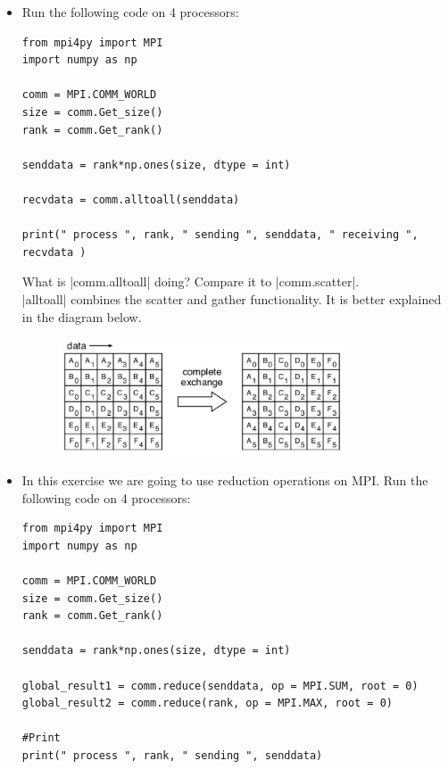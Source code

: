 \documentclass[11pt]{article}
\begin{document}
\begin{itemize}
   \item Run the following code on 4 processors:
   \begin{verbatim}
from mpi4py import MPI
import numpy as np

comm = MPI.COMM_WORLD
size = comm.Get_size()
rank = comm.Get_rank()

senddata = rank*np.ones(size, dtype = int)

recvdata = comm.alltoall(senddata)

print(" process ", rank, " sending ", senddata, " receiving ", recvdata )
   \end{verbatim}
   What is |comm.alltoall| doing? Compare it to |comm.scatter|. \\
   |alltoall| combines the scatter and gather functionality. It is better explained in the diagram below.
   \begin{figure}[H]
     \centering
      \includegraphics[width=0.8\textwidth]{../figures/alltoall}
\end{figure}
   \item In this exercise we are going to use reduction operations on MPI. Run the following code on 4 processors:
   \begin{verbatim}
from mpi4py import MPI
import numpy as np

comm = MPI.COMM_WORLD
size = comm.Get_size()
rank = comm.Get_rank()

senddata = rank*np.ones(size, dtype = int)

global_result1 = comm.reduce(senddata, op = MPI.SUM, root = 0)
global_result2 = comm.reduce(rank, op = MPI.MAX, root = 0)

#Print
print(" process ", rank, " sending ", senddata)


\end{verbatim}
\end{itemize}
\end{document}

